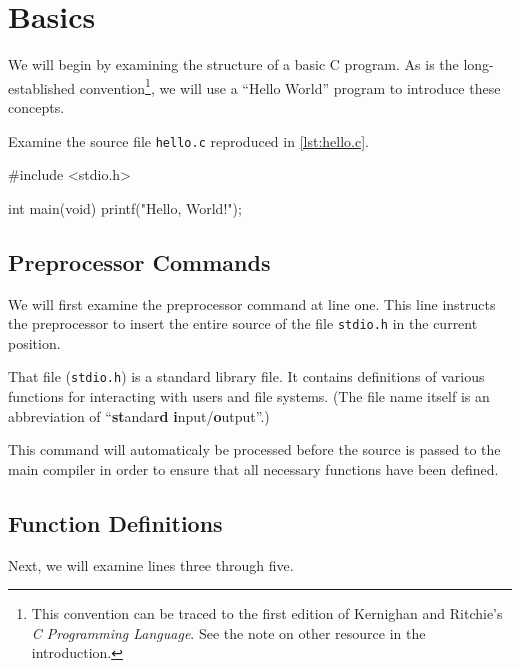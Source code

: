\documentclass[IntroToC.tex]{subfiles}
\begin{document}
\chapter{Basics}

We will begin by examining the structure of a basic C program. As is the 
long-established convention\footnote{This convention can be traced to the first edition
of Kernighan and Ritchie's \emph{C Programming Language}. See the note on 
other resource in the introduction.}, we will use a ``Hello World'' program to
introduce these concepts.

Examine the source file \texttt{hello.c} reproduced in \autoref{lst:hello.c}.

\begin{code}[caption=Source of the Hello World program.,label=lst:hello.c]
#include <stdio.h>

int main(void) {
	printf("Hello, World!");
}
\end{code}

\section{Preprocessor Commands}
We will first examine the preprocessor command at line one. This line instructs
the preprocessor to insert the entire source of the file \texttt{stdio.h} in the
current position.

That file (\texttt{stdio.h}) is a standard library file. It contains definitions
of various functions for interacting with users and file systems. (The file name
itself is an abbreviation of ``\textbf{st}andar\textbf{d}
\textbf{i}nput/\textbf{o}utput''.)

This command will automaticaly be processed before the source is passed to the
main compiler in order to ensure that all necessary functions have been defined.

\section{Function Definitions}
Next, we will examine lines three through five.
\end{document}
